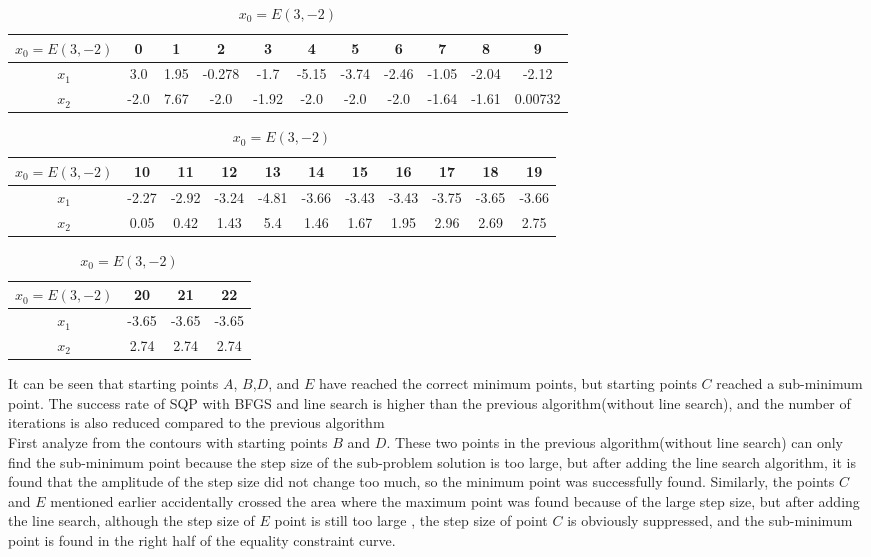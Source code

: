 \begin{table}[H]
\centering
\setlength{\abovecaptionskip}{0cm} 
\setlength{\belowcaptionskip}{-0.5cm}
\scriptsize
\begin{tabular}{|c|c|c|c|c|c|c|c|c|c|c|}
\hline
$x_0=E(3,-2)$&0&1&2&3&4&5&6&7&8&9\\
\hline
$x_1$&3.0 & 1.95 & -0.278 & -1.7 & -5.15 & -3.74 & -2.46 & -1.05 & -2.04 & -2.12  \\
\hline
$x_2$&-2.0 & 7.67 & -2.0 & -1.92 & -2.0 & -2.0 & -2.0 & -1.64 & -1.61 & 0.00732 
\\
\hline
\end{tabular}
\begin{tabular}{|c|c|c|c|c|c|c|c|c|c|c|}
\hline
$x_0=E(3,-2)$&10&11&12&13&14&15&16&17&18&19\\
\hline
$x_1$ &-2.27 & -2.92 & -3.24 & -4.81 & -3.66 & -3.43 & -3.43 & -3.75 & -3.65 & -3.66\\
\hline
$x_2$&   0.05 & 0.42 & 1.43 & 5.4 & 1.46 & 1.67 & 1.95 & 2.96 & 2.69 & 2.75
\\
\hline

\end{tabular}
\begin{tabular}{|c|c|c|c|}
\hline
$x_0=E(3,-2)$&20&21&22\\
\hline
$x_1$ &-3.65 & -3.65 & -3.65\\
\hline
$x_2$&   2.74 & 2.74 & 2.74
\\
\hline

\end{tabular}
\caption{$x_0=E(3,-2)$}
\end{table}

It can be seen that starting points $A$, $B$,$D$, and $E$ have reached the correct minimum points, but starting points $C$ reached a sub-minimum point. The success rate of SQP with BFGS and line search is higher than the previous algorithm(without line search), and the number of iterations is also reduced compared to the previous algorithm\\

First analyze from the contours with starting points $B$ and $D$. These two points in the previous algorithm(without line search) can only find the sub-minimum point because the step size of the sub-problem solution is too large, but after adding the line search algorithm, it is found that the amplitude of the step size did not change too much, so the minimum point was successfully found. Similarly, the points $C$ and $E$ mentioned earlier accidentally crossed the area where the maximum point was found because of the large step size, but after adding the line search, although the step size of $E$ point is still too large , the step size of point $C$ is obviously suppressed, and the sub-minimum point is found in the right half of the equality constraint curve.

